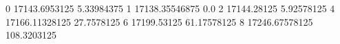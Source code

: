 0 17143.6953125 5.33984375
1 17138.35546875 0.0
2 17144.28125 5.92578125
4 17166.11328125 27.7578125
6 17199.53125 61.17578125
8 17246.67578125 108.3203125
